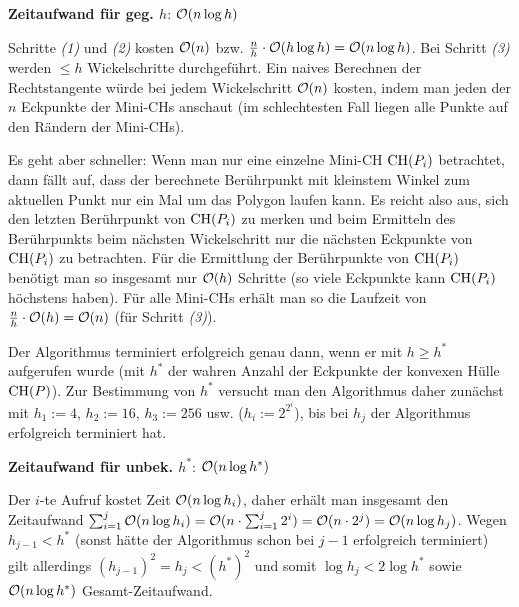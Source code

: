 \linie

\textbf{Zeitaufwand für geg. $h$}:
$\mathcal{O}(n \log h)$

\begin{Beweis}
    Schritte \emph{(1)} und \emph{(2)} kosten $\mathcal{O}(n)$ bzw.
    $\frac{n}{h} \cdot \mathcal{O}(h \log h) = \mathcal{O}(n \log h)$.
    Bei Schritt \emph{(3)} werden $\le h$ Wickelschritte durchgeführt.
    Ein naives Berechnen der Rechtstangente würde bei jedem Wickelschritt $\mathcal{O}(n)$ kosten,
    indem man jeden der $n$ Eckpunkte der Mini-CHs anschaut
    (im schlechtesten Fall liegen alle Punkte auf den Rändern der Mini-CHs).
    
    Es geht aber schneller:
    Wenn man nur eine einzelne Mini-CH $\operatorname{CH}(P_i)$ betrachtet, dann fällt auf,
    dass der berechnete Berührpunkt mit kleinstem Winkel zum aktuellen Punkt
    nur ein Mal um das Polygon laufen kann.
    Es reicht also aus, sich den letzten Berührpunkt von $\operatorname{CH}(P_i)$ zu merken und
    beim Ermitteln des Berührpunkts beim nächsten Wickelschritt nur die nächsten Eckpunkte
    von $\operatorname{CH}(P_i)$ zu betrachten.
    Für die Ermittlung der Berührpunkte von $\operatorname{CH}(P_i)$ benötigt man so insgesamt nur
    $\mathcal{O}(h)$ Schritte (so viele Eckpunkte kann $\operatorname{CH}(P_i)$ höchstens haben).
    Für alle Mini-CHs erhält man so die Laufzeit von $\frac{n}{h} \cdot \mathcal{O}(h) = \mathcal{O}(n)$
    (für Schritt \emph{(3)}).
\end{Beweis}

\linie

Der Algorithmus terminiert erfolgreich genau dann, wenn er mit $h \ge h^\ast$ aufgerufen wurde
(mit $h^\ast$ der wahren Anzahl der Eckpunkte der konvexen Hülle $\operatorname{CH}(P)$).
Zur Bestimmung von $h^\ast$ versucht man den Algorithmus daher zunächst mit
$h_1 := 4$, $h_2 := 16$, $h_3 := 256$ usw. ($h_i := 2^{2^i}$),
bis bei $h_j$ der Algorithmus erfolgreich terminiert hat.

\textbf{Zeitaufwand für unbek. $h^\ast$}: $\mathcal{O}(n \log h^\ast)$

\begin{Beweis}
    Der $i$-te Aufruf kostet Zeit $\mathcal{O}(n \log h_i)$, daher erhält man insgesamt den Zeitaufwand
    $\sum_{i=1}^j \mathcal{O}(n \log h_i) = \mathcal{O}(n \cdot \sum_{i=1}^j 2^i) =
    \mathcal{O}(n \cdot 2^j) = \mathcal{O}(n \log h_j)$.
    Wegen $h_{j-1} < h^\ast$ (sonst hätte der Algorithmus schon bei $j - 1$ erfolgreich terminiert)
    gilt allerdings $(h_{j-1})^2 = h_j < (h^\ast)^2$ und somit
    $\log h_j < 2 \log h^\ast$ sowie
    $\mathcal{O}(n \log h^\ast)$ Gesamt-Zeitaufwand.
\end{Beweis}

